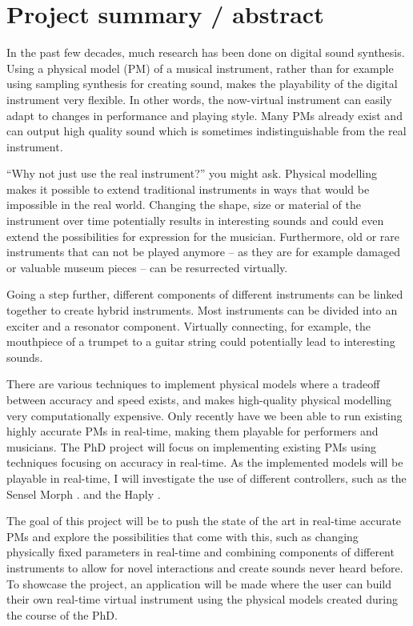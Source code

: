 \section{Project summary / abstract}

In the past few decades, much research has been done on digital sound synthesis. Using a physical model (PM) of a musical instrument, rather than for example using sampling synthesis for creating sound, makes the playability of the digital instrument very flexible. In other words, the now-virtual instrument can easily adapt to changes in performance and playing style. Many PMs already exist and can output high quality sound which is sometimes indistinguishable from the real instrument.

“Why not just use the real instrument?” you might ask. Physical modelling makes it possible to extend traditional instruments in ways that would be impossible in  the real world. Changing the shape, size or material of the instrument over time potentially results in interesting sounds and could even extend the possibilities for expression for the musician. Furthermore, old or rare instruments that can not be played anymore -- as they are for example damaged or valuable museum pieces -- can be resurrected virtually.

Going a step further, different components of different instruments can be linked together to create hybrid instruments. Most instruments can be divided into an exciter and a resonator component. Virtually connecting, for example, the mouthpiece of a trumpet to a guitar string could potentially lead to interesting sounds.

There are various techniques to implement physical models where a tradeoff between accuracy and speed exists, and makes high-quality physical modelling very computationally expensive. Only recently have we been able to run existing highly accurate PMs in real-time, making them playable for performers and musicians. The PhD project will focus on implementing existing PMs using techniques focusing on accuracy in real-time. As the implemented models will be playable in real-time, I will investigate the use of different controllers, such as the Sensel Morph \cite{Sensel2019}. and the Haply \cite{Haply2019}.

The goal of this project will be to push the state of the art in real-time accurate PMs and explore the possibilities that come with this, such as changing physically fixed parameters in real-time and combining components of different instruments to allow for novel interactions and create sounds never heard before. To showcase the project, an application will be made where the user can build their own real-time virtual instrument using the physical models created during the course of the PhD. 


